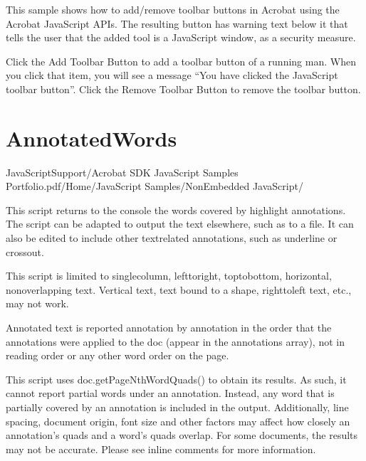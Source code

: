 \documentclass[letterpaper,12pt,english,openany,oneside]{sphinxmanual}
\begin{document}
This sample shows how to add/remove toolbar buttons in Acrobat using the Acrobat JavaScript APIs. The resulting button has warning text below it that tells the user that the added tool is a JavaScript window, as a security measure.


Click the Add Toolbar Button to add a toolbar button of a running man. When you click that item, you will see a message “You have clicked the JavaScript toolbar button”. Click the Remove Toolbar Button to remove the toolbar button.


\section{AnnotatedWords}
\label{\detokenize{Samples_JavaScript:annotatedwords}}\label{\detokenize{Samples_JavaScript:location-3}}

JavaScriptSupport/Acrobat SDK JavaScript Samples Portfolio.pdf/Home/JavaScript Samples/Non\sphinxhyphen{}Embedded JavaScript/

\label{\detokenize{Samples_JavaScript:description-3}}

This script returns to the console the words covered by highlight annotations. The script can be adapted to output the text elsewhere, such as to a file. It can also be edited to include other text\sphinxhyphen{}related annotations, such as underline or cross\sphinxhyphen{}out.

This script is limited to single\sphinxhyphen{}column, left\sphinxhyphen{}to\sphinxhyphen{}right, top\sphinxhyphen{}to\sphinxhyphen{}bottom, horizontal, non\sphinxhyphen{}overlapping text. Vertical text, text bound to a shape, right\sphinxhyphen{}to\sphinxhyphen{}left text, etc., may not work.

Annotated text is reported annotation by annotation in the order that the annotations were applied to the doc (appear in the annotations array), not in reading order or any other word order on the page.

This script uses doc.getPageNthWordQuads() to obtain its results. As such, it cannot report partial words under an annotation. Instead, any word that is partially covered by an annotation is included in the output. Additionally, line spacing, document origin, font size and other factors may affect how closely an annotation’s quads and a word’s quads overlap. For some documents, the results may not be accurate. Please see in\sphinxhyphen{}line comments for more information.
\end{document}
